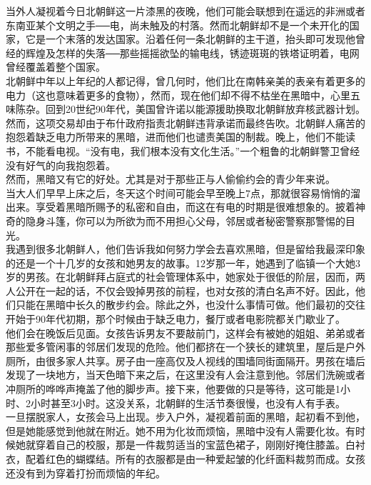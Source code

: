 当外人凝视着今日北朝鲜这一片漆黑的夜晚，他们可能会联想到在遥远的非洲或者东南亚某个文明之手──电，尚未触及的村落。然而北朝鲜却不是一个未开化的国家，它是一个末落的发达国家。沿着任何一条北朝鲜的主干道，抬头即可发现他曾经的辉煌及怎样的失落──那些摇摇欲坠的输电线，锈迹斑斑的铁塔证明着，电网曾经覆盖着整个国家。\\

北朝鲜中年以上年纪的人都记得，曾几何时，他们比在南韩亲美的表亲有着更多的电力（这也意味着更多的食物），然而，现在他们却不得不枯坐在黑暗中，心里五味陈杂。回到20世纪90年代，美国曾许诺以能源援助换取北朝鲜放弃核武器计划。然而，这项交易却由于布什政府指责北朝鲜违背承诺而最终告吹。北朝鲜人痛苦的抱怨着缺乏电力所带来的黑暗，进而他们也谴责美国的制裁。晚上，他们不能读书，不能看电视。“没有电，我们根本没有文化生活。”一个粗鲁的北朝鲜警卫曾经没有好气的向我抱怨着。\\

然而，黑暗又有它的好处。尤其是对于那些正与人偷偷约会的青少年来说。\\

当大人们早早上床之后，冬天这个时间可能会早至晚上7点，那就很容易悄悄的溜出来。享受着黑暗所赐予的私密和自由，而这在有电的时期是很难想象的。披着神奇的隐身斗篷，你可以为所欲为而不用担心父母，邻居或者秘密警察那警惕的目光。\\

我遇到很多北朝鲜人，他们告诉我如何努力学会去喜欢黑暗，但是留给我最深印象的还是一个十几岁的女孩和她男友的故事。12岁那一年，她遇到了临镇一个大她3岁的男孩。在北朝鲜拜占庭式的社会管理体系中，她家处于很低的阶层，因而，两人公开在一起的话，不仅会毁掉男孩的前程，也对女孩的清白名声不好。因此，他们只能在黑暗中长久的散步约会。除此之外，也没什么事情可做。他们最初的交往开始于90年代初期，那个时候由于缺乏电力，餐厅或者电影院都关门歇业了。\\

他们会在晚饭后见面。女孩告诉男友不要敲前门，这样会有被她的姐姐、弟弟或者那些爱多管闲事的邻居们发现的危险。他们都挤在一个狭长的建筑里，屋后是户外厕所，由很多家人共享。房子由一座高仅及人视线的围墙同街面隔开。男孩在墙后发现了一块地方，当天色暗下来之后，在这里没有人会注意到他。邻居们洗碗或者冲厕所的哗哗声掩盖了他的脚步声。接下来，他要做的只是等待，这可能是1小时、2小时甚至3小时。这没关系，北朝鲜的生活节奏很慢，也没有人有手表。\\

一旦摆脱家人，女孩会马上出现。步入户外，凝视着前面的黑暗，起初看不到他，但是她能感觉到他就在附近。她不用为化妆而烦恼，黑暗中没有人需要化妆。有时候她就穿着自己的校服，那是一件裁剪适当的宝蓝色裙子，刚刚好掩住膝盖。白衬衣，配着红色的蝴蝶结。所有的衣服都是由一种爱起皱的化纤面料裁剪而成。女孩还没有到为穿着打扮而烦恼的年纪。\\

